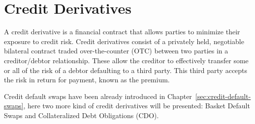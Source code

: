\chapter{Credit Derivatives}

A credit derivative is a financial contract that allows parties to minimize their exposure to credit risk. Credit derivatives consist of a privately held, negotiable bilateral contract traded over-the-counter (OTC) between two parties in a creditor/debtor relationship. These allow the creditor to effectively transfer some or all of the risk of a debtor defaulting to a third party. This third party accepts the risk in return for payment, known as the premium.

Credit default swaps have been already introduced in Chapter~\ref{sec:credit-default-swaps}, here two more kind of credit derivatives will be presented: Basket Default Swaps and Collateralized Debt Obligations (CDO).

